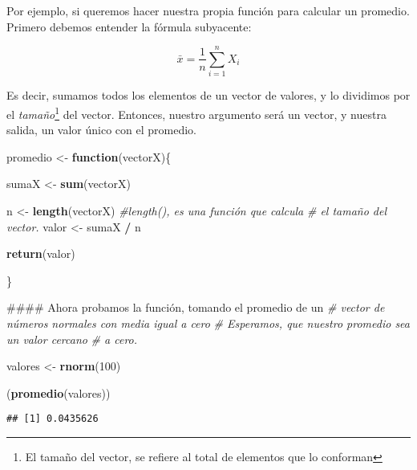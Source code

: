 \documentclass[12pt,letterpaper,]{book}
\newenvironment{Shaded}{\begin{snugshade}}{\end{snugshade}}
\newcommand{\KeywordTok}[1]{\textcolor[rgb]{0.13,0.29,0.53}{\textbf{#1}}}
\newcommand{\DecValTok}[1]{\textcolor[rgb]{0.00,0.00,0.81}{#1}}
\newcommand{\StringTok}[1]{\textcolor[rgb]{0.31,0.60,0.02}{#1}}
\newcommand{\CommentTok}[1]{\textcolor[rgb]{0.56,0.35,0.01}{\textit{#1}}}
\newcommand{\ControlFlowTok}[1]{\textcolor[rgb]{0.13,0.29,0.53}{\textbf{#1}}}
\newcommand{\OperatorTok}[1]{\textcolor[rgb]{0.81,0.36,0.00}{\textbf{#1}}}
\newcommand{\NormalTok}[1]{#1}
\let\rmarkdownfootnote\footnote%
\def\footnote{\protect\rmarkdownfootnote}
\begin{document}
Por ejemplo, si queremos hacer nuestra propia función para calcular un
promedio. Primero debemos entender la fórmula subyacente:

\[
\bar{x}= \frac{1}{n} \sum_{i=1}^{n} X_i
\]

Es decir, sumamos todos los elementos de un vector de valores, y lo
dividimos por el
\emph{tamaño}\footnote{El tamaño del vector, se refiere al total de elementos que lo conforman}
del vector. Entonces, nuestro argumento será un vector, y nuestra
salida, un valor único con el promedio.

\begin{Shaded}
\begin{Highlighting}[]
\NormalTok{promedio <-}\StringTok{ }\ControlFlowTok{function}\NormalTok{(vectorX)\{}
 
\NormalTok{   sumaX <-}\StringTok{ }\KeywordTok{sum}\NormalTok{(vectorX)}
   
\NormalTok{  n <-}\StringTok{ }\KeywordTok{length}\NormalTok{(vectorX) }\CommentTok{#length(), es una función que calcula }
                       \CommentTok{#   el tamaño del vector.}
\NormalTok{  valor <-}\StringTok{ }\NormalTok{sumaX }\OperatorTok{/}\StringTok{ }\NormalTok{n }
  
  \KeywordTok{return}\NormalTok{(valor)}
  
\NormalTok{\}}

\NormalTok{#### Ahora probamos la función, tomando el promedio de un }
\CommentTok{#       vector de números normales con media igual a cero}
\CommentTok{#       Esperamos, que nuestro promedio sea un valor cercano}
\CommentTok{#         a cero.}

\NormalTok{valores <-}\StringTok{ }\KeywordTok{rnorm}\NormalTok{(}\DecValTok{100}\NormalTok{)}

\NormalTok{(}\KeywordTok{promedio}\NormalTok{(valores))}
\end{Highlighting}
\end{Shaded}

\begin{verbatim}
## [1] 0.0435626
\end{verbatim}


\end{document}
